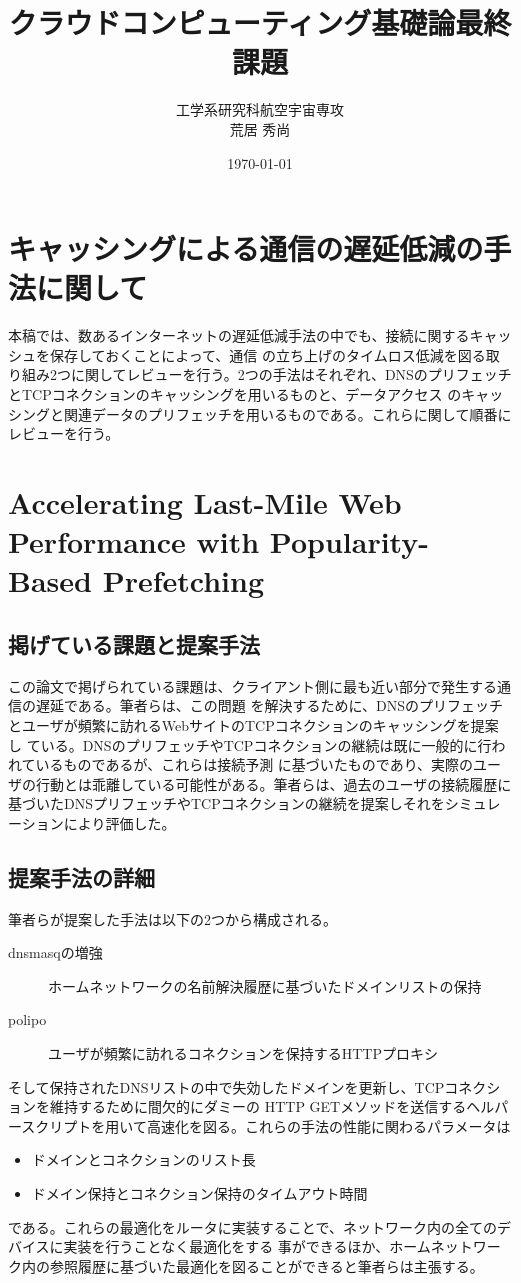 \documentclass[10pt,a4paper]{ltjsarticle}       %
\title{クラウドコンピューティング基礎論最終課題}
\author{工学系研究科航空宇宙専攻\\荒居 秀尚}
\date{\today}
\begin{document}
\maketitle
\thispagestyle{fancy}
\section{キャッシングによる通信の遅延低減の手法に関して}
本稿では、数あるインターネットの遅延低減手法の中でも、接続に関するキャッシュを保存しておくことによって、通信
の立ち上げのタイムロス低減を図る取り組み2つに関してレビューを行う。2つの手法はそれぞれ、DNSのプリフェッチ
とTCPコネクションのキャッシングを用いるもの\cite{sundaresan2012accelerating}と、データアクセス
のキャッシングと関連データのプリフェッチを用いるもの\cite{chen2007data}である。これらに関して順番に
レビューを行う。
\section{Accelerating Last-Mile Web Performance with Popularity-Based Prefetching}
\subsection{掲げている課題と提案手法}
この論文で掲げられている課題は、クライアント側に最も近い部分で発生する通信の遅延である。筆者らは、この問題
を解決するために、DNSのプリフェッチとユーザが頻繁に訪れるWebサイトのTCPコネクションのキャッシングを提案し
ている。DNSのプリフェッチやTCPコネクションの継続は既に一般的に行われているものであるが、これらは接続予測
に基づいたものであり、実際のユーザの行動とは乖離している可能性がある。筆者らは、過去のユーザの接続履歴に
基づいたDNSプリフェッチやTCPコネクションの継続を提案しそれをシミュレーションにより評価した。
\subsection{提案手法の詳細}
筆者らが提案した手法は以下の2つから構成される。
\begin{description}
  \item [dnsmasqの増強] ホームネットワークの名前解決履歴に基づいたドメインリストの保持
  \item [polipo] ユーザが頻繁に訪れるコネクションを保持するHTTPプロキシ
\end{description}
そして保持されたDNSリストの中で失効したドメインを更新し、TCPコネクションを維持するために間欠的にダミーの
HTTP GETメソッドを送信するヘルパースクリプトを用いて高速化を図る。これらの手法の性能に関わるパラメータは
\begin{itemize}
  \item ドメインとコネクションのリスト長
  \item ドメイン保持とコネクション保持のタイムアウト時間
\end{itemize}
である。これらの最適化をルータに実装することで、ネットワーク内の全てのデバイスに実装を行うことなく最適化をする
事ができるほか、ホームネットワーク内の参照履歴に基づいた最適化を図ることができると筆者らは主張する。
\end{document}
